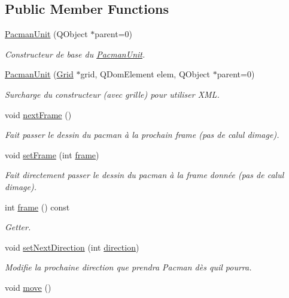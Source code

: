 \subsection*{Public Member Functions}
\begin{DoxyCompactItemize}
\item 
\hyperlink{class_pacman_unit_a5da689e1d96160428b625a861cdb7406}{Pacman\+Unit} (Q\+Object $\ast$parent=0)
\begin{DoxyCompactList}\small\item\em Constructeur de base du \hyperlink{class_pacman_unit}{Pacman\+Unit}. \end{DoxyCompactList}\item 
\hyperlink{class_pacman_unit_a5aaebd34aa813060d373a5a80597e4ed}{Pacman\+Unit} (\hyperlink{class_grid}{Grid} $\ast$grid, Q\+Dom\+Element elem, Q\+Object $\ast$parent=0)
\begin{DoxyCompactList}\small\item\em Surcharge du constructeur (avec grille) pour utiliser X\+M\+L. \end{DoxyCompactList}\item 
\hypertarget{class_pacman_unit_afea95a3310aad0ad96f7a22b616e1dc3}{}void \hyperlink{class_pacman_unit_afea95a3310aad0ad96f7a22b616e1dc3}{next\+Frame} ()\label{class_pacman_unit_afea95a3310aad0ad96f7a22b616e1dc3}

\begin{DoxyCompactList}\small\item\em Fait passer le dessin du pacman à la prochain frame (pas de calul d\textquotesingle{}image). \end{DoxyCompactList}\item 
void \hyperlink{class_pacman_unit_a9c4c0c4677e8cda4d9f65d4be17a16f7}{set\+Frame} (int \hyperlink{class_pacman_unit_a55cd713a2c14b16d26c06846598dfbec}{frame})
\begin{DoxyCompactList}\small\item\em Fait directement passer le dessin du pacman à la frame donnée (pas de calul d\textquotesingle{}image). \end{DoxyCompactList}\item 
int \hyperlink{class_pacman_unit_a55cd713a2c14b16d26c06846598dfbec}{frame} () const 
\begin{DoxyCompactList}\small\item\em Getter. \end{DoxyCompactList}\item 
void \hyperlink{class_pacman_unit_a3f5d014178425c2ee077d982ad5f0d7c}{set\+Next\+Direction} (int \hyperlink{class_unit_a5d8a5a789acfa4d2502b0c1082876172}{direction})
\begin{DoxyCompactList}\small\item\em Modifie la prochaine direction que prendra Pacman dès qu\textquotesingle{}il pourra. \end{DoxyCompactList}\item 
\hypertarget{class_pacman_unit_adc791959727ea73b022d37be8d60fa8f}{}void \hyperlink{class_pacman_unit_adc791959727ea73b022d37be8d60fa8f}{move} ()\label{class_pacman_unit_adc791959727ea73b022d37be8d60fa8f}


\end{DoxyCompactItemize}
